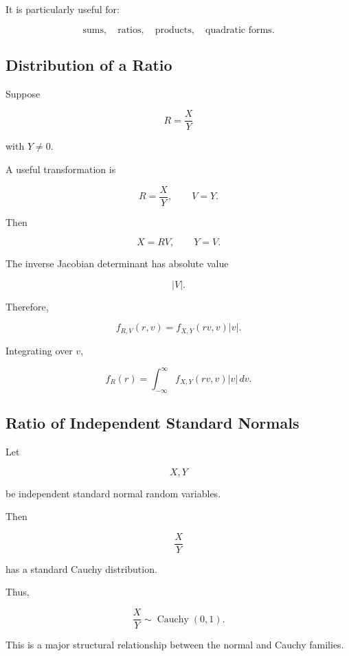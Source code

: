 It is particularly useful for:

\[
\text{sums},
\quad
\text{ratios},
\quad
\text{products},
\quad
\text{quadratic forms}.
\]

\subsection{Distribution of a Ratio}
\label{subsec:distribution-ratio}

Suppose

\[
R=\frac{X}{Y}
\]

with \(Y\neq0\).

A useful transformation is

\[
R=\frac{X}{Y},
\qquad
V=Y.
\]

Then

\[
X=RV,
\qquad
Y=V.
\]

The inverse Jacobian determinant has absolute value

\[
\boxed{
|V|.
}
\]

Therefore,

\[
\boxed{
f_{R,V}(r,v)
=
f_{X,Y}(rv,v)|v|.
}
\]

Integrating over \(v\),

\[
\boxed{
f_R(r)
=
\int_{-\infty}^{\infty}
f_{X,Y}(rv,v)|v|\,dv.
}
\]

\subsection{Ratio of Independent Standard Normals}
\label{subsec:ratio-normal-cauchy}

Let

\[
X,Y
\]

be independent standard normal random variables.

Then

\[
\boxed{
\frac{X}{Y}
}
\]

has a standard Cauchy distribution.

Thus,

\[
\boxed{
\frac{X}{Y}
\sim
\operatorname{Cauchy}(0,1).
}
\]

This is a major structural relationship between the normal and Cauchy
families.

